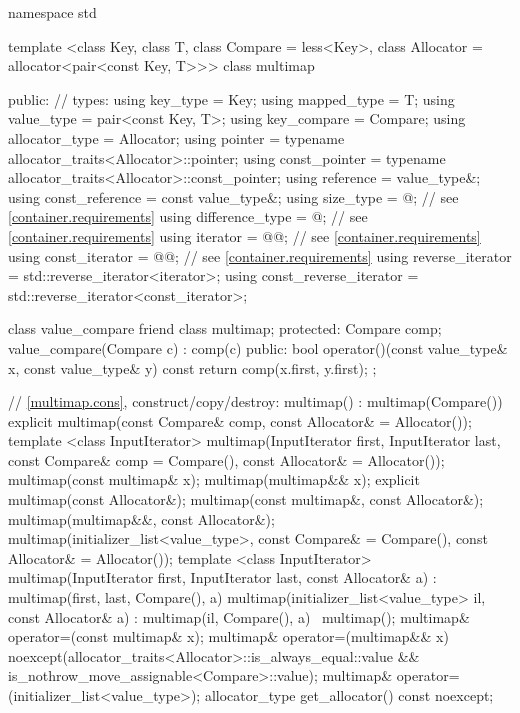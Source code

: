 \begin{codeblock}
namespace std {
  template <class Key, class T, class Compare = less<Key>,
            class Allocator = allocator<pair<const Key, T>>>
  class multimap {
  public:
    // types:
    using key_type               = Key;
    using mapped_type            = T;
    using value_type             = pair<const Key, T>;
    using key_compare            = Compare;
    using allocator_type         = Allocator;
    using pointer                = typename allocator_traits<Allocator>::pointer;
    using const_pointer          = typename allocator_traits<Allocator>::const_pointer;
    using reference              = value_type&;
    using const_reference        = const value_type&;
    using size_type              = @\impdef@; // see \ref{container.requirements}
    using difference_type        = @\impdef@; // see \ref{container.requirements}
    using iterator               = @@; // see \ref{container.requirements}
    using const_iterator         = @@; // see \ref{container.requirements}
    using reverse_iterator       = std::reverse_iterator<iterator>;
    using const_reverse_iterator = std::reverse_iterator<const_iterator>;

    class value_compare {
      friend class multimap;
    protected:
      Compare comp;
      value_compare(Compare c) : comp(c) { }
    public:
      bool operator()(const value_type& x, const value_type& y) const {
        return comp(x.first, y.first);
      }
    };

    // \ref{multimap.cons}, construct/copy/destroy:
    multimap() : multimap(Compare()) { }
    explicit multimap(const Compare& comp, const Allocator& = Allocator());
    template <class InputIterator>
      multimap(InputIterator first, InputIterator last,
               const Compare& comp = Compare(),
               const Allocator& = Allocator());
    multimap(const multimap& x);
    multimap(multimap&& x);
    explicit multimap(const Allocator&);
    multimap(const multimap&, const Allocator&);
    multimap(multimap&&, const Allocator&);
    multimap(initializer_list<value_type>,
      const Compare& = Compare(),
      const Allocator& = Allocator());
    template <class InputIterator>
      multimap(InputIterator first, InputIterator last, const Allocator& a)
        : multimap(first, last, Compare(), a) { }
    multimap(initializer_list<value_type> il, const Allocator& a)
      : multimap(il, Compare(), a) { }
    ~multimap();
    multimap& operator=(const multimap& x);
    multimap& operator=(multimap&& x)
      noexcept(allocator_traits<Allocator>::is_always_equal::value &&
               is_nothrow_move_assignable<Compare>::value);
    multimap& operator=(initializer_list<value_type>);
    allocator_type get_allocator() const noexcept;

}}
\end{codeblock}
